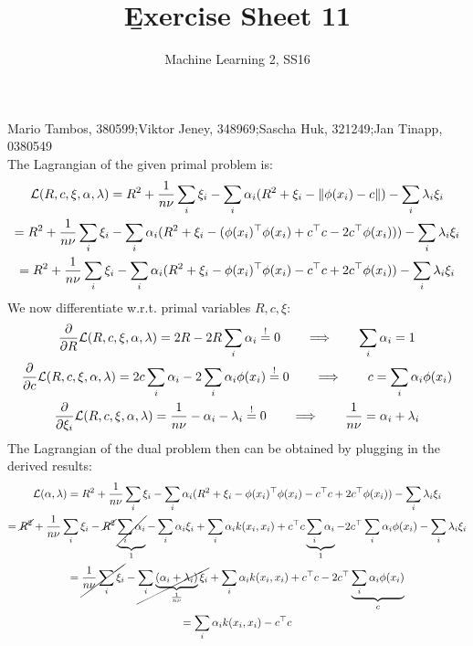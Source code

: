 \documentclass[a4paper]{article}
\newcommand{\norm}[1]{\left\lVert#1\right\rVert}
\newcommand{\eqq}{  \overset{\text{!}}{=} }
\newcommand{\1}{\mathds{1}}
\newcommand{\lag}{\mathcal{L}}
\begin{document}
\title{\b{Exercise Sheet 11}}
\author{Machine Learning 2, SS16}

\maketitle

Mario Tambos, 380599;\quad Viktor Jeney, 348969;\quad Sascha Huk, 321249;\quad Jan Tinapp, 0380549\\

The Lagrangian of the given primal problem is: 
\begin{gather*}
	\lag(R,c,\xi,\alpha,\lambda) = R^2 + {1\over n \nu}\sum_i \xi_i
	- \sum_i \alpha_i ( R^2 + \xi_i - \norm{\phi(x_i)-c}  )
	- \sum_i \lambda_i \xi_i
	\\
	=
	R^2 + {1\over n\nu}\sum_i \xi_i
	- \sum_i \alpha_i ( R^2 + \xi_i - (\phi(x_i)^\top\phi(x_i) + c^\top c - 2c^\top\phi(x_i))  )
	- \sum_i \lambda_i \xi_i
	\\
	=
	R^2 + {1\over n\nu}\sum_i \xi_i
	- \sum_i \alpha_i ( R^2 + \xi_i - \phi(x_i)^\top\phi(x_i) - c^\top c + 2c^\top\phi(x_i) )
	- \sum_i \lambda_i \xi_i	
\end{gather*}
We now differentiate w.r.t. primal variables $R,c,\xi$: 
\begin{gather*}
	{\partial\over\partial R}\lag(R,c,\xi,\alpha,\lambda) 
	=
	2R-2R\sum_i\alpha_i \eqq 0 
	\quad\quad\Longrightarrow\quad\quad
	\sum_i \alpha_i = 1
	\\
	{\partial\over\partial c}\lag(R,c,\xi,\alpha,\lambda) 
	=
	2c\sum_i\alpha_i - 2\sum_i\alpha_i\phi(x_i) \eqq 0
	\quad\quad\Longrightarrow\quad\quad
	c = \sum_i\alpha_i\phi(x_i) 
	\\
	{\partial\over\partial \xi_i}\lag(R,c,\xi,\alpha,\lambda) 
	=
	{1\over n\nu} - \alpha_i - \lambda_i \eqq 0
	\quad\quad\Longrightarrow\quad\quad
	{1\over n\nu} = \alpha_i + \lambda_i
\end{gather*}
The Lagrangian of the dual problem then can be obtained by plugging in the derived results: 
\begin{gather*}
	\lag(\alpha, \lambda )
	=
	R^2 + {1\over n\nu}\sum_i \xi_i
	- \sum_i \alpha_i ( R^2 + \xi_i - \phi(x_i)^\top\phi(x_i) - c^\top c + 2c^\top\phi(x_i) )
	- \sum_i \lambda_i \xi_i
	\\
	=
	\cancel{R^2} + {1\over n\nu}\sum_i \xi_i
	- \cancel{R^2} \underbrace{\cancel{\sum_i \alpha_i}}_{1}
	- \sum_i \alpha_i \xi_i
	+ \sum_i \alpha_i k(x_i,x_i)
	+ c^\top c \underbrace{\sum_i \alpha_i}_{1} 
	- 2c^\top \sum_i \alpha_i \phi(x_i)
	- \sum_i \lambda_i \xi_i
	\\
	=
	\cancel{{1\over n\nu}\sum_i \xi_i}
	- \cancel{\sum_i \underbrace{(\alpha_i + \lambda_i)}_{1\over n\nu} \xi_i}
	+ \sum_i \alpha_i k(x_i,x_i)
	+ c^\top c 
	- 2c^\top\underbrace{\sum_i \alpha_i \phi(x_i)}_{c}
	\\
	=
	\sum_i \alpha_i k(x_i,x_i)
	- c^\top c 
\end{gather*}
\end{document}
